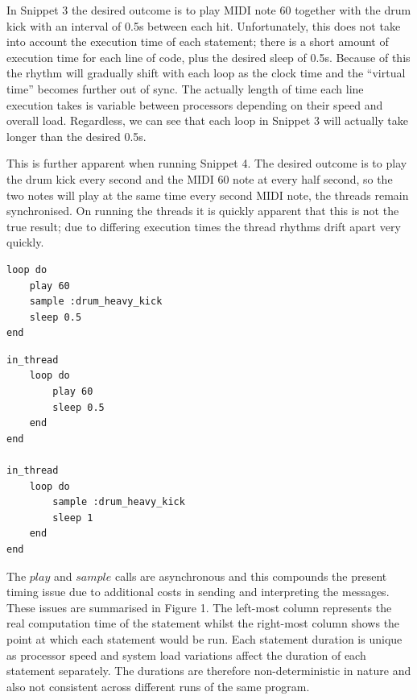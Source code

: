 \documentclass[11pt, abstracton, twoside, titlepage=true]{scrartcl}
\begin{document}
\begin{multicols}{2}
In Snippet 3 the desired outcome is to play MIDI note 60 together with the 
drum kick with an interval of 0.5s between each hit. Unfortunately, this does 
not take into account the execution time of each statement; there is a short 
amount of execution time for each line of code, plus the desired sleep of 0.5s.
Because of this the rhythm will gradually shift with each loop as the 
clock time and the ``virtual time'' becomes further out of sync. The 
actually length of time each line execution takes is variable between 
processors depending on their speed and overall load. Regardless, we can see 
that each loop in Snippet 3 will actually take longer than the desired 0.5s.

This is further apparent when running Snippet 4. The desired outcome is to 
play the drum kick every second and the MIDI 60 note at every half second, so 
the two notes will play at the same time every second MIDI note, the threads 
remain synchronised. On running the threads it is quickly apparent that this 
is not the true result; due to differing execution times the thread rhythms 
drift apart very quickly.

	\begin{minipage}{0.5\textwidth}

		\begin{minipage}{\textwidth}
			\begin{lstlisting}[style = sonicpi]
loop do
    play 60
    sample :drum_heavy_kick
    sleep 0.5
end
			\end{lstlisting}
		\end{minipage}

		\begin{minipage}{\textwidth}
			\begin{lstlisting}[style = sonicpi]
in_thread
    loop do
        play 60
        sleep 0.5
    end
end

in_thread
    loop do
        sample :drum_heavy_kick
        sleep 1
    end
end
			\end{lstlisting}
		\end{minipage}

	\end{minipage}

\end{multicols}

The $play$ and $sample$ calls are asynchronous and this compounds the present 
timing issue due to additional costs in sending and interpreting the messages. 
These issues are summarised in Figure 1. The left-most column represents the 
real computation time of the statement whilst the right-most column shows the 
point at which each statement would be run. Each statement duration is unique 
as processor speed and system load variations affect the duration of each 
statement separately. The durations are therefore non-deterministic in nature 
and also not consistent across different runs of the same program.
\end{document}
